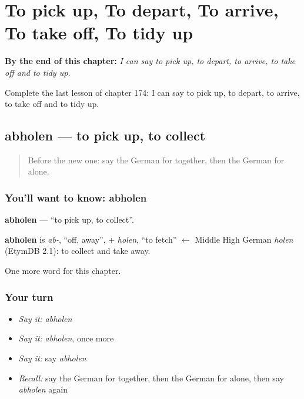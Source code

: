 
\chapter{To pick up, To depart, To arrive, To take off, To tidy up}
\label{ch:ge-to-pick-up-to-depart-to-arrive-to-take-off-to-tidy-up}

\begin{chapteropening}
\textbf{By the end of this chapter:} \emph{I can say to pick up, to depart, to arrive, to take off and to tidy up.}

Complete the last lesson of chapter 174: I can say to pick up, to depart, to arrive, to take off and to tidy up.
\end{chapteropening}

\section[abholen]{abholen — to pick up, to collect}

\label{lesson:GE-C174-abholen}



\begin{quote}
Before the new one: say the German for together, then the German for alone.
\end{quote}

\subsection*{You'll want to know: abholen}
\textbf{abholen} — \textquotedblleft{}to pick up, to collect\textquotedblright{}.

\begin{cousinweb}
\textbf{abholen} is \emph{ab-}, \textquotedblleft{}off, away\textquotedblright{}, + \emph{holen}, \textquotedblleft{}to fetch\textquotedblright{} $\leftarrow$ Middle High German \emph{holen} (EtymDB 2.1): to collect and take away.
\end{cousinweb}

\begin{grammarlens}[title={What you've built}]
One more word for this chapter.
\end{grammarlens}

\subsection*{Your turn}
\begin{itemize}
\raggedright
  \item \emph{Say it:} \emph{abholen}
  \item \emph{Say it:} \emph{abholen}, once more
  \item \emph{Say it:} say \emph{abholen}
  \item \emph{Recall:} say the German for together, then the German for alone, then say \emph{abholen} again
\end{itemize}

